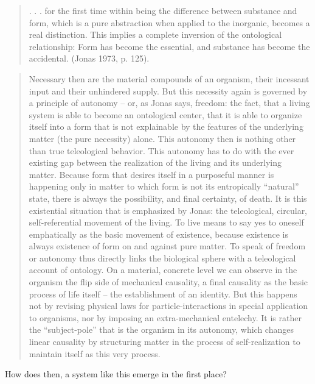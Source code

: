 \documentclass[a4paper,12pt,twoside,leqno]{article}
\begin{document}
\begin{quote}
. . . for the first time within being the difference between substance and form, which is a
pure abstraction when applied to the inorganic, becomes a real distinction. This implies a
complete inversion of the ontological relationship: Form has become the essential, and
substance has become the accidental. (Jonas 1973, p. 125).
\end{quote}
\begin{quote}
Necessary then are the material compounds of an organism, their incessant
input and their unhindered supply. But this necessity again is governed by a
principle of autonomy – or, as Jonas says, freedom: the fact, that a living system is able to become an ontological center, that it is able to organize itself
into a form that is not explainable by the features of the underlying matter (the
pure necessity) alone. This autonomy then is nothing other than true teleological behavior. This autonomy has to do with the ever existing gap between the
realization of the living and its underlying matter. Because form that desires
itself in a purposeful manner is happening only in matter to which form is not
its entropically “natural” state, there is always the possibility, and final certainty, of death. It is this existential situation that is emphasized by Jonas: the
teleological, circular, self-referential movement of the living. To live means
to say yes to oneself emphatically as the basic movement of existence, because
existence is always existence of form on and against pure matter.
To speak of freedom or autonomy thus directly links the biological sphere
with a teleological account of ontology. On a material, concrete level we can
observe in the organism the flip side of mechanical causality, a final causality
as the basic process of life itself – the establishment of an identity. But this
happens not by revising physical laws for particle-interactions in special application to organisms, nor by imposing an extra-mechanical entelechy. It is
rather the “subject-pole” that is the organism in its autonomy, which changes
linear causality by structuring matter in the process of self-realization to
maintain itself as this very process.
\end{quote}
How does then, a system like this emerge in the first place?
\end{document}
